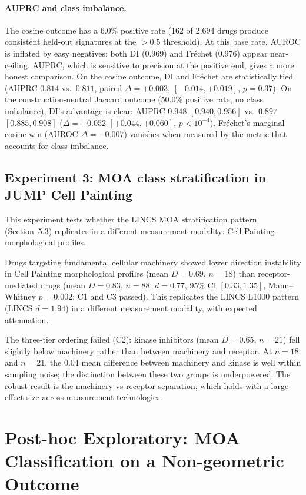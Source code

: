 \documentclass[11pt]{article}
\begin{document}
\paragraph{AUPRC and class imbalance.}
The cosine outcome has a 6.0\% positive rate (162 of 2{,}694 drugs
produce consistent held-out signatures at the $>0.5$ threshold). At this
base rate, AUROC is inflated by easy negatives: both DI (0.969) and
Fr\'{e}chet (0.976) appear near-ceiling. AUPRC, which is sensitive to
precision at the positive end, gives a more honest comparison. On the
cosine outcome, DI and Fr\'{e}chet are statistically tied (AUPRC $0.814$
vs.\ $0.811$, paired $\Delta = +0.003$, $[-0.014, +0.019]$, $p = 0.37$).
On the construction-neutral Jaccard outcome (50.0\% positive rate, no
class imbalance), DI's advantage is clear: AUPRC $0.948$ $[0.940,
0.956]$ vs.\ $0.897$ $[0.885, 0.908]$ ($\Delta = +0.052$ $[+0.044,
+0.060]$, $p < 10^{-4}$). Fr\'{e}chet's marginal cosine win
(AUROC $\Delta = -0.007$) vanishes when measured by the metric that
accounts for class imbalance.

\subsection{Experiment 3: MOA class stratification in JUMP Cell Painting}

This experiment tests whether the LINCS MOA stratification pattern
(Section~5.3) replicates in a different measurement modality: Cell
Painting morphological profiles.

Drugs targeting fundamental cellular machinery showed lower direction
instability in Cell Painting morphological profiles (mean $D = 0.69$,
$n = 18$) than receptor-mediated drugs (mean $D = 0.83$, $n = 88$;
$d = 0.77$, 95\% CI $[0.33, 1.35]$, Mann--Whitney $p = 0.002$; C1 and C3 passed). This
replicates the LINCS L1000 pattern (LINCS $d = 1.94$) in a different
measurement modality, with expected attenuation.

The three-tier ordering failed (C2): kinase inhibitors (mean $D = 0.65$,
$n = 21$) fell slightly below machinery rather than between machinery
and receptor. At $n = 18$ and $n = 21$, the $0.04$ mean difference
between machinery and kinase is well within sampling noise; the
distinction between these two groups is underpowered. The robust result
is the machinery-vs-receptor separation, which holds with a large
effect size across measurement technologies.

\section{Post-hoc Exploratory: MOA Classification on a Non-geometric Outcome}
\label{sec:moa_auroc}
\end{document}
